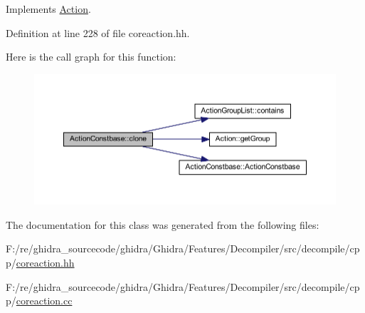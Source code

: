 Implements \mbox{\hyperlink{class_action_af8242e41d09e5df52f97df9e65cc626f}{Action}}.



Definition at line 228 of file coreaction.\+hh.

Here is the call graph for this function\+:
\nopagebreak
\begin{figure}[H]
\begin{center}
\leavevmode
\includegraphics[width=350pt]{class_action_constbase_ab9c45ce9b49d6543abced9909598f2e0_cgraph}
\end{center}
\end{figure}


The documentation for this class was generated from the following files\+:\begin{DoxyCompactItemize}
\item 
F\+:/re/ghidra\+\_\+sourcecode/ghidra/\+Ghidra/\+Features/\+Decompiler/src/decompile/cpp/\mbox{\hyperlink{coreaction_8hh}{coreaction.\+hh}}\item 
F\+:/re/ghidra\+\_\+sourcecode/ghidra/\+Ghidra/\+Features/\+Decompiler/src/decompile/cpp/\mbox{\hyperlink{coreaction_8cc}{coreaction.\+cc}}\end{DoxyCompactItemize}
